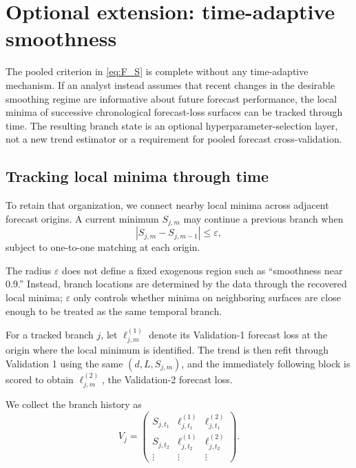 \section{Optional extension: time-adaptive smoothness}
\label{sec:optional_dynamic}

The pooled criterion in \cref{eq:F_S} is complete without any
time-adaptive mechanism. If an analyst instead assumes that recent
changes in the desirable smoothing regime are informative about
future forecast performance, the local minima of successive
chronological forecast-loss surfaces can be tracked through time.
The resulting branch state is an optional hyperparameter-selection
layer, not a new trend estimator or a requirement for pooled
forecast cross-validation.

\subsection{Tracking local minima through time}

To retain that organization, we connect nearby local minima across adjacent forecast origins. A current minimum $S_{j,m}$ may continue a previous branch when
\begin{equation}
\label{eq:epsilon_tracking}
|S_{j,m}-S_{j,m-1}|
\le
\varepsilon,
\end{equation}
subject to one-to-one matching at each origin.

The radius $\varepsilon$ does not define a fixed exogenous region such as ``smoothness near 0.9.'' Instead, branch locations are determined by the data through the recovered local minima; $\varepsilon$ only controls whether minima on neighboring surfaces are close enough to be treated as the same temporal branch.

For a tracked branch $j$, let $\ell^{(1)}_{j,m}$ denote its Validation-1 forecast loss at the origin where the local minimum is identified. The trend is then refit through Validation 1 using the same $(d,L,S_{j,m})$, and the immediately following block is scored to obtain $\ell^{(2)}_{j,m}$, the Validation-2 forecast loss.

We collect the branch history as
\begin{equation}
\label{eq:branch_matrix}
V_j
=
\begin{pmatrix}
S_{j,t_1} & \ell^{(1)}_{j,t_1} & \ell^{(2)}_{j,t_1}\\
S_{j,t_2} & \ell^{(1)}_{j,t_2} & \ell^{(2)}_{j,t_2}\\
\vdots & \vdots & \vdots
\end{pmatrix}.
\end{equation}

